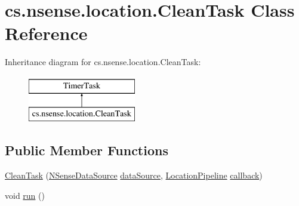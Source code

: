 \hypertarget{classcs_1_1nsense_1_1location_1_1_clean_task}{\section{cs.\-nsense.\-location.\-Clean\-Task Class Reference}
\label{classcs_1_1nsense_1_1location_1_1_clean_task}
}
Inheritance diagram for cs.\-nsense.\-location.\-Clean\-Task\-:\begin{figure}[H]
\begin{center}
\leavevmode
\includegraphics[height=2.000000cm]{classcs_1_1nsense_1_1location_1_1_clean_task}
\end{center}
\end{figure}
\subsection*{Public Member Functions}
\begin{DoxyCompactItemize}
\item 
\hyperlink{classcs_1_1nsense_1_1location_1_1_clean_task_ac379a0b2516624e684efe0658f1f38c6}{Clean\-Task} (\hyperlink{classcs_1_1nsense_1_1db_1_1_n_sense_data_source}{N\-Sense\-Data\-Source} \hyperlink{classcs_1_1nsense_1_1location_1_1_clean_task_ab00a705d76c6ffffea7a5fa1bad2518e}{data\-Source}, \hyperlink{classcs_1_1nsense_1_1location_1_1_location_pipeline}{Location\-Pipeline} \hyperlink{classcs_1_1nsense_1_1location_1_1_clean_task_a6846bf31429f1e764b7306075ef3eb0d}{callback})
\item 
void \hyperlink{classcs_1_1nsense_1_1location_1_1_clean_task_a0e0a628174bf740e83869ad76916a216}{run} ()
\end{DoxyCompactItemize}
